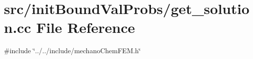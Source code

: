 \section{src/init\+Bound\+Val\+Probs/get\+\_\+solution.cc File Reference}
\label{get__solution_8cc}
{\ttfamily \#include \char`\"{}../../include/mechano\+Chem\+F\+E\+M.\+h\char`\"{}}\newline
